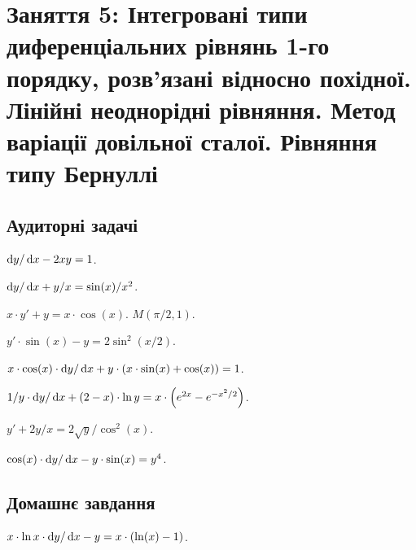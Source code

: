 \section*{Заняття 5: Інтегровані типи диференціальних рівнянь 1-го порядку, розв'язані відносно похідної. Лінійні неоднорідні рівняння. Метод варіації довільної сталої. Рівняння типу Бернуллі}

\subsection*{Аудиторні задачі}

\begin{problem}
	$\mathop{}\!\mathrm{d} y / \mathop{}\!\mathrm{d} x - 2 x y = 1$.
\end{problem}

\begin{problem}
	$\mathop{}\!\mathrm{d} y / \mathop{}\!\mathrm{d} x + y / x = \sin (x) / x^2$.
\end{problem}

\begin{problem}
	$x \cdot y' + y = x \cdot \cos(x)$.  $M(\pi / 2, 1)$.
\end{problem}

\begin{problem}
	$y' \cdot \sin (x) - y = 2 \sin^2 (x / 2)$.
\end{problem}

\begin{problem}
	$x \cdot \cos (x) \cdot \mathop{}\!\mathrm{d} y / \mathop{}\!\mathrm{d} x + y \cdot (x \cdot \sin (x) + \cos (x)) = 1$.
\end{problem}

\begin{problem}
	$1 / y \cdot \mathop{}\!\mathrm{d} y / \mathop{}\!\mathrm{d} x + (2 - x) \cdot \ln y = x \cdot \left( e^{2 x} - e^{-x^2 / 2} \right)$.
\end{problem}

\begin{problem}
	$y' + 2 y / x = 2 \sqrt{y} / \cos^2 (x)$.
\end{problem}

\begin{problem}
	$\cos(x) \cdot \mathop{}\!\mathrm{d} y / \mathop{}\!\mathrm{d} x - y \cdot \sin (x) = y^4$.
\end{problem}

\subsection*{Домашнє завдання}

\begin{problem}
	$x \cdot \ln x \cdot \mathop{}\!\mathrm{d} y / \mathop{}\!\mathrm{d} x - y = x \cdot (\ln (x) - 1)$.
\end{problem}


